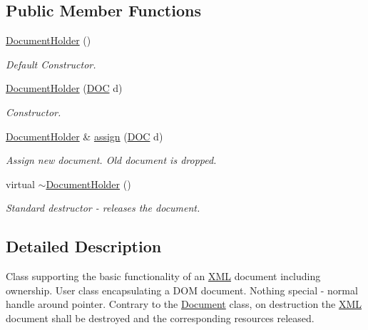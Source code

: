 \subsection*{Public Member Functions}
\begin{DoxyCompactItemize}
\item 
\hyperlink{class_d_d4hep_1_1_x_m_l_1_1_document_holder_abeb4692ba8b187e1b65921f3f53a0b64}{DocumentHolder} ()
\begin{DoxyCompactList}\small\item\em Default Constructor. \item\end{DoxyCompactList}\item 
\hyperlink{class_d_d4hep_1_1_x_m_l_1_1_document_holder_a8b64dfa073e0343d39b882cb24ce3ffa}{DocumentHolder} (\hyperlink{class_d_d4hep_1_1_x_m_l_1_1_document_a685ff83de83e9b7b37e79ad846fc2387}{DOC} d)
\begin{DoxyCompactList}\small\item\em Constructor. \item\end{DoxyCompactList}\item 
\hyperlink{class_d_d4hep_1_1_x_m_l_1_1_document_holder}{DocumentHolder} \& \hyperlink{class_d_d4hep_1_1_x_m_l_1_1_document_holder_ab71ec2747100221649d868aece161d1e}{assign} (\hyperlink{class_d_d4hep_1_1_x_m_l_1_1_document_a685ff83de83e9b7b37e79ad846fc2387}{DOC} d)
\begin{DoxyCompactList}\small\item\em Assign new document. Old document is dropped. \item\end{DoxyCompactList}\item 
virtual \hyperlink{class_d_d4hep_1_1_x_m_l_1_1_document_holder_a3620e4a3c05901eaefe31ea2e7fff5f5}{$\sim$DocumentHolder} ()
\begin{DoxyCompactList}\small\item\em Standard destructor -\/ releases the document. \item\end{DoxyCompactList}\end{DoxyCompactItemize}


\subsection{Detailed Description}
Class supporting the basic functionality of an \hyperlink{namespace_d_d4hep_1_1_x_m_l}{XML} document including ownership. User class encapsulating a DOM document. Nothing special -\/ normal handle around pointer. Contrary to the \hyperlink{class_d_d4hep_1_1_x_m_l_1_1_document}{Document} class, on destruction the \hyperlink{namespace_d_d4hep_1_1_x_m_l}{XML} document shall be destroyed and the corresponding resources released.

